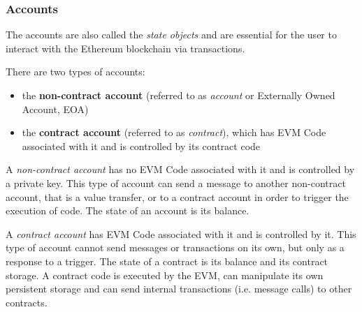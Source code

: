 \subsubsection{Accounts}
\label{sec:accounts}

The accounts are also called the \emph{state objects} and are essential for the
user to interact with the Ethereum blockchain via transactions.

There are two types of accounts:

\begin{itemize}
  \item the \textbf{non-contract account} (referred to as \emph{account} or
  Externally Owned Account, EOA)
  \item the \textbf{contract account} (referred to as \emph{contract}), which
  has EVM Code associated with it and is controlled by its contract code
\end{itemize}

A \emph{non-contract account} has no EVM Code associated with it and is
controlled by a private key. This type of account can send a message to another
non-contract account, that is a value transfer, or to a contract account in
order to trigger the execution of code. The state of an account is its balance.

A \emph{contract account} has EVM Code associated with it and is controlled by
it. This type of account cannot send messages or transactions on its own, but
only as a response to a trigger. The state of a contract is its balance and its
contract storage. A contract code is executed by the EVM, can manipulate its own
persistent storage and can send internal transactions (i.e. message calls) to
other contracts.
